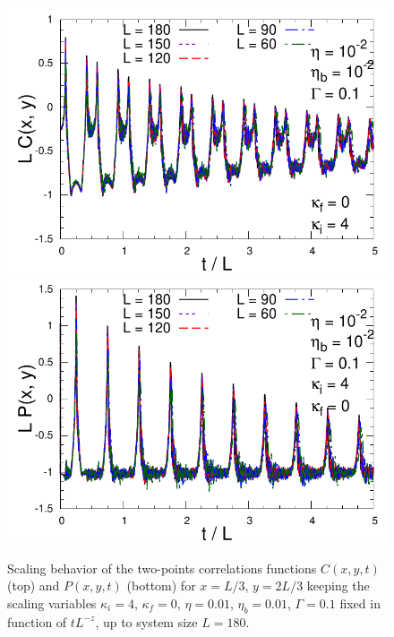 \documentclass[pra,twocolumn,preprintnumbers,amsmath,amssymb,nofootinbib,floatfix,longbibliography]{revtex4}
\begin{document}
\begin{figure}[!htb]
  \includegraphics[width=0.95\columnwidth]
    {figs/LCk4q0e001t001S0100.pdf}
  \includegraphics[width=0.95\columnwidth]
    {figs/LPk4q0e001t001S0100.pdf}
  \caption{Scaling behavior of the two-points
    correlations functions $C(x,y,t)$ (top) and $P(x,y,t)$
    (bottom) for $x=L/3$, $y=2L/3$  keeping the scaling
    variables $\kappa_i=4$, $\kappa_f=0$, $\eta =0.01$,
    $\eta_b=0.01$, $\Gamma=0.1$ fixed in function of
    $tL^{-z}$, up to system size $L=180$.}
  \label{k4q0e001t001S0100}
\end{figure}
\end{document}
